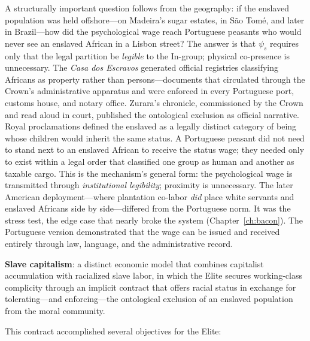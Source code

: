 A structurally important question follows from the geography: if the enslaved population was held offshore---on Madeira's sugar estates, in S\~{a}o Tom\'{e}, and later in Brazil---how did the psychological wage reach Portuguese peasants who would never see an enslaved African in a Lisbon street? The answer is that $\psi_s$ requires only that the legal partition be \textit{legible} to the In-group; physical co-presence is unnecessary. The \textit{Casa dos Escravos} generated official registries classifying Africans as property rather than persons---documents that circulated through the Crown's administrative apparatus and were enforced in every Portuguese port, customs house, and notary office. Zurara's chronicle, commissioned by the Crown and read aloud in court, published the ontological exclusion as official narrative. Royal proclamations defined the enslaved as a legally distinct category of being whose children would inherit the same status. A Portuguese peasant did not need to stand next to an enslaved African to receive the status wage; they needed only to exist within a legal order that classified one group as human and another as taxable cargo. This is the mechanism's general form: the psychological wage is transmitted through \textit{institutional legibility}; proximity is unnecessary. The later American deployment---where plantation co-labor \textit{did} place white servants and enslaved Africans side by side---differed from the Portuguese norm. It was the stress test, the edge case that nearly broke the system (Chapter~\ref{ch:bacon}). The Portuguese version demonstrated that the wage can be issued and received entirely through law, language, and the administrative record.

\begin{definition}
\textbf{Slave capitalism}: a distinct economic model that combines capitalist accumulation with racialized slave labor, in which the Elite secures working-class complicity through an implicit contract that offers racial status in exchange for tolerating---and enforcing---the ontological exclusion of an enslaved population from the moral community.
\end{definition}

This contract accomplished several objectives for the Elite:

